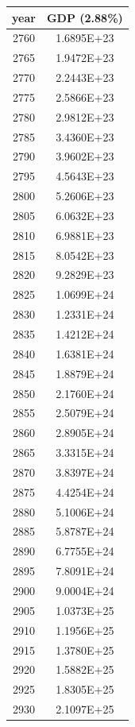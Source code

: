 \documentclass[a4paper]{article}
\begin{document}
	\begin{tabular}{|c|c|}
		\hline
		year & GDP (2.88\%) \\
		\hline
		2760 & 1.6895E+23 \\
		\hline
		2765 & 1.9472E+23 \\
		\hline
		2770 & 2.2443E+23 \\
		\hline
		2775 & 2.5866E+23 \\
		\hline
		2780 & 2.9812E+23 \\
		\hline
		2785 & 3.4360E+23 \\
		\hline
		2790 & 3.9602E+23 \\
		\hline
		2795 & 4.5643E+23 \\
		\hline
		2800 & 5.2606E+23 \\
		\hline
		2805 & 6.0632E+23 \\
		\hline
		2810 & 6.9881E+23 \\
		\hline
		2815 & 8.0542E+23 \\
		\hline
		2820 & 9.2829E+23 \\
		\hline
		2825 & 1.0699E+24 \\
		\hline
		2830 & 1.2331E+24 \\
		\hline
		2835 & 1.4212E+24 \\
		\hline
		2840 & 1.6381E+24 \\
		\hline
		2845 & 1.8879E+24 \\
		\hline
		2850 & 2.1760E+24 \\
		\hline
		2855 & 2.5079E+24 \\
		\hline
		2860 & 2.8905E+24 \\
		\hline
		2865 & 3.3315E+24 \\
		\hline
		2870 & 3.8397E+24 \\
		\hline
		2875 & 4.4254E+24 \\
		\hline
		2880 & 5.1006E+24 \\
		\hline
		2885 & 5.8787E+24 \\
		\hline
		2890 & 6.7755E+24 \\
		\hline
		2895 & 7.8091E+24 \\
		\hline
		2900 & 9.0004E+24 \\
		\hline
		2905 & 1.0373E+25 \\
		\hline
		2910 & 1.1956E+25 \\
		\hline
		2915 & 1.3780E+25 \\
		\hline
		2920 & 1.5882E+25 \\
		\hline
		2925 & 1.8305E+25 \\
		\hline
		2930 & 2.1097E+25 \\

\end{tabular}
\end{document}
